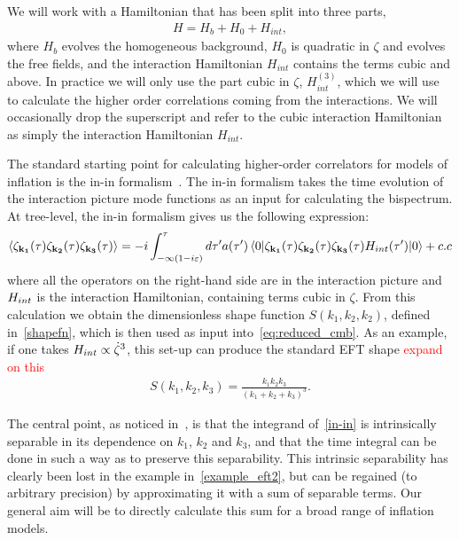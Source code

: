     We will work with a Hamiltonian that has been split into three parts,
    \begin{align}
        H = H_b + H_0 + H_{int},
    \end{align}
    where $H_b$ evolves the homogeneous background, $H_0$ is quadratic in $\zeta$ and evolves the free
    fields, and the interaction Hamiltonian $H_{int}$ contains the terms cubic and above.
    In practice we will only use the part cubic in $\zeta$, $H_{int}^{(3)}$, which we will use to calculate
    the higher order correlations coming from the interactions. We will occasionally drop the superscript and
    refer to the cubic interaction Hamiltonian as simply the interaction Hamiltonian $H_{int}$.


    The standard starting point for calculating
higher-order correlators for models of inflation is the in-in formalism~\cite{Maldacena,weinberg_in_in}.
The in-in formalism takes the time evolution of the interaction picture mode
functions as an input for calculating the bispectrum.
At tree-level, the in-in formalism gives us the
following expression:
\begin{align}
{
    \left< \zeta_{\mathbf{k_1}}(\tau)\zeta_{\mathbf{k_2}}(\tau)\zeta_{\mathbf{k_3}}(\tau) \right>
=-i\int_{-\infty(1-i\varepsilon)}^{\tau}d\tau'a(\tau')
    \left<0\lvert \zeta_{\mathbf{k_1}}(\tau)\zeta_{\mathbf{k_2}}(\tau)\zeta_{\mathbf{k_3}}(\tau)H_{int}(\tau') \rvert0\right>+c.c\label{in-in}
}
\end{align}
where all the operators on the right-hand side are in the interaction picture
and $H_{int}$ is the interaction Hamiltonian, containing terms cubic in $\zeta$.
From this calculation we obtain the dimensionless shape function $S(k_1,k_2,k_2)$,
defined in~\eqref{shapefn},
which is then used as input into~\eqref{eq:reduced_cmb}.
As an example, if one takes $H_{int}\propto\dot{\zeta}^3$, this set-up can produce the standard EFT shape
\textcolor{red}{expand on this}
\begin{align}\label{example_eft2}
    S(k_1, k_2, k_3) = \frac{k_1k_2k_3}{(k_1+k_2+k_3)^3}.
\end{align}

The central point, as noticed in~\cite{Funakoshi}, is that the
integrand of~\eqref{in-in} is intrinsically separable
in its dependence on $k_1$, $k_2$ and $k_3$, and that the time integral
can be done in such a way as to preserve this separability.
This intrinsic separability has clearly been lost in
the example in~\eqref{example_eft2},
but can be regained (to arbitrary precision) by approximating it
with a sum of separable terms. Our general aim will be to directly calculate
this sum for a broad range of inflation models.

